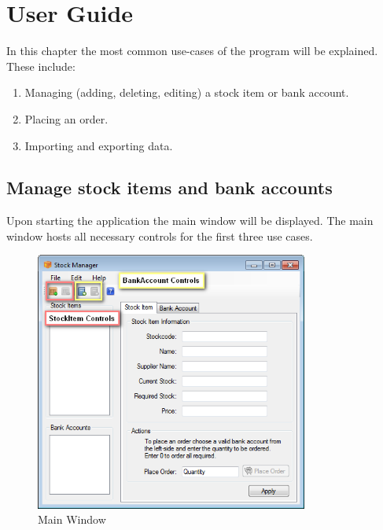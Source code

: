 \chapter{User Guide}\label{ch:user_guide} %

In this chapter the most common use-cases of the program will be explained. These include:

\begin{enumerate}
\item Managing (adding, deleting, editing) a stock item or bank account.
\item Placing an order.
\item Importing and exporting data.
\end{enumerate}

\section{Manage stock items and bank accounts}
\label{sec:manage_stock_item}

Upon starting the application the main window will be displayed.
The main window hosts all necessary controls for the first three use cases.

\begin{figure}[H]
\begin{center}
\includegraphics[width=0.8\textwidth]{gfx/main_window.png}
\caption{Main Window}
\label{fig:main_window}
\end{center}
\end{figure}

